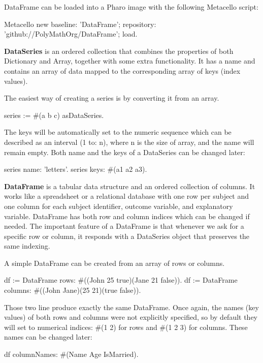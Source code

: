 \documentclass{article}
\begin{document}
\begin{multicols}{2}
DataFrame can be loaded into a Pharo image with the following Metacello script:
\begin{code}{}
Metacello new
    baseline: 'DataFrame';
    repository: 'github://PolyMathOrg/DataFrame';
    load.
\end{code}
\textbf{DataSeries} is an ordered collection that combines the properties of both Dictionary and Array, together with some extra functionality. It has a name and contains an array of data mapped to the corresponding array of keys (index values).

The easiest way of creating a series is by converting it from an array. 
\begin{code}{}
series := #(a b c) asDataSeries.
\end{code}
The keys will be automatically set to the numeric sequence which can be described as an interval (1 to: n), where n is the size of array, and the name will remain empty. Both name and the keys of a DataSeries can be changed later:
\begin{code}{}
series name: 'letters'.
series keys: #(a1 a2 a3).
\end{code}
\textbf{DataFrame} is a tabular data structure and an ordered collection of columns. It works like a spreadsheet or a relational database with one row per subject and one column for each subject identifier, outcome variable, and explanatory variable. DataFrame has both row and column indices which can be changed if needed. The important feature of a DataFrame is that whenever we ask for a specific row or column, it responds with a DataSeries object that preserves the same indexing.

A simple DataFrame can be created from an array of rows or columns.
\begin{code}{}
df := DataFrame rows: #((John 25 true)(Jane 21 false)).
df := DataFrame columns: #((John Jane)(25 21)(true false)).
\end{code}
Those two line produce exactly the same DataFrame. Once again, the names (key values) of both rows and columns were not explicitly specified, so by default they will set to numerical indices: \#(1 2) for rows and \#(1 2 3) for columns. These names can be changed later:
\begin{code}{}
df columnNames: #(Name Age IsMarried).
\end{code}


\end{multicols}
\end{document}
